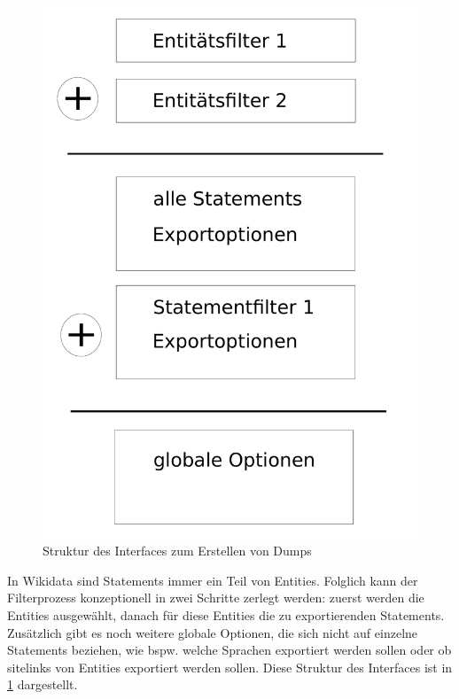 \begin{figure}
  \includegraphics[width=\textwidth]{pics/ui-layout}
  \caption{Struktur des Interfaces zum Erstellen von Dumps}
  \label{fig:ui-layout}
\end{figure}

In Wikidata sind Statements immer ein Teil von Entities.
Folglich kann der Filterprozess konzeptionell in zwei Schritte zerlegt werden: zuerst werden die Entities ausgewählt, danach für diese Entities die zu exportierenden Statements.
Zusätzlich gibt es noch weitere globale Optionen, die sich nicht auf einzelne Statements beziehen, wie bspw. welche Sprachen exportiert werden sollen oder ob sitelinks von Entities exportiert werden sollen.
Diese Struktur des Interfaces ist in \cref{fig:ui-layout} dargestellt.

